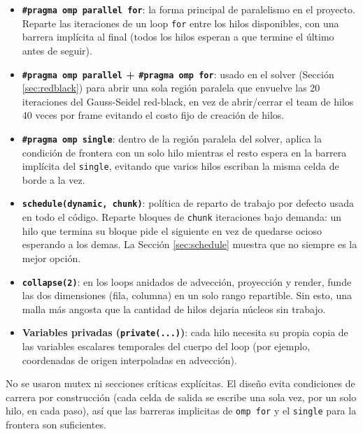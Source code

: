 \documentclass[11pt]{article}
\begin{document}
\begin{itemize}
    \item \textbf{\texttt{\#pragma omp parallel for}}: la forma principal
        de paralelismo en el proyecto. Reparte las iteraciones de un loop
        \texttt{for} entre los hilos disponibles, con una barrera
        implícita al final (todos los hilos esperan a que termine el
        último antes de seguir).
    \item \textbf{\texttt{\#pragma omp parallel} + \texttt{\#pragma omp
        for}}: usado en el solver (Sección \ref{sec:redblack}) para abrir
        una sola región paralela que envuelve las 20 iteraciones del
        Gauss-Seidel red-black, en vez de abrir/cerrar el team de hilos 40
        veces por frame evitando el costo fijo de creación de hilos.
    \item \textbf{\texttt{\#pragma omp single}}: dentro de la región
        paralela del solver, aplica la condición de frontera con un solo
        hilo mientras el resto espera en la barrera implícita del
        \texttt{single}, evitando que varios hilos escriban la misma
        celda de borde a la vez.
    \item \textbf{\texttt{schedule(dynamic, chunk)}}: política de reparto
        de trabajo por defecto usada en todo el código. Reparte bloques
        de \texttt{chunk} iteraciones bajo demanda: un hilo que termina su
        bloque pide el siguiente en vez de quedarse ocioso esperando a
        los demas. La Sección \ref{sec:schedule} muestra que no siempre es
        la mejor opción.
    \item \textbf{\texttt{collapse(2)}}: en los loops anidados de
        advección, proyección y render, funde las dos dimensiones (fila,
        columna) en un solo rango repartible. Sin esto, una malla más
        angosta que la cantidad de hilos dejaria núcleos sin trabajo.
    \item \textbf{Variables privadas (\texttt{private(...)})}: cada hilo
        necesita su propia copia de las variables escalares temporales
        del cuerpo del loop (por ejemplo, coordenadas de origen
        interpoladas en advección). 
\end{itemize}

No se usaron mutex ni secciones críticas explícitas. El diseño evita
condiciones de carrera por construcción (cada celda de salida se escribe
una sola vez, por un solo hilo, en cada paso), así que las barreras
implicitas de \texttt{omp for} y el \texttt{single} para la frontera son
suficientes.
\end{document}
